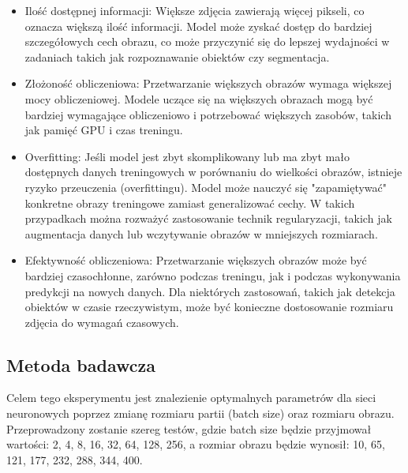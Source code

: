 \documentclass[12pt,twoside]{article}
\begin{document}
\begin{itemize}
	\item Ilość dostępnej informacji: Większe zdjęcia zawierają więcej pikseli, co oznacza większą ilość informacji. Model może zyskać dostęp do bardziej szczegółowych cech obrazu, co może przyczynić się do lepszej wydajności w zadaniach takich jak rozpoznawanie obiektów czy segmentacja.
 
 \item Złożoność obliczeniowa: Przetwarzanie większych obrazów wymaga większej mocy obliczeniowej. Modele uczące się na większych obrazach mogą być bardziej wymagające obliczeniowo i potrzebować większych zasobów, takich jak pamięć GPU i czas treningu.
 

 \item Overfitting: Jeśli model jest zbyt skomplikowany lub ma zbyt mało dostępnych danych treningowych w porównaniu do wielkości obrazów, istnieje ryzyko przeuczenia (overfittingu). Model może nauczyć się "zapamiętywać" konkretne obrazy treningowe zamiast generalizować cechy. W takich przypadkach można rozważyć zastosowanie technik regularyzacji, takich jak augmentacja danych lub wczytywanie obrazów w mniejszych rozmiarach.
 
 \item Efektywność obliczeniowa: Przetwarzanie większych obrazów może być bardziej czasochłonne, zarówno podczas treningu, jak i podczas wykonywania predykcji na nowych danych. Dla niektórych zastosowań, takich jak detekcja obiektów w czasie rzeczywistym, może być konieczne dostosowanie rozmiaru zdjęcia do wymagań czasowych.
 

\end{itemize}


\subsection{Metoda badawcza}

Celem tego eksperymentu jest znalezienie optymalnych parametrów dla sieci neuronowych poprzez zmianę rozmiaru partii (batch size) oraz rozmiaru obrazu. Przeprowadzony zostanie szereg testów, gdzie batch size będzie przyjmował wartości: 2, 4, 8, 16, 32, 64, 128, 256, a rozmiar obrazu będzie wynosił: 10, 65, 121, 177, 232, 288, 344, 400.
\end{document}
